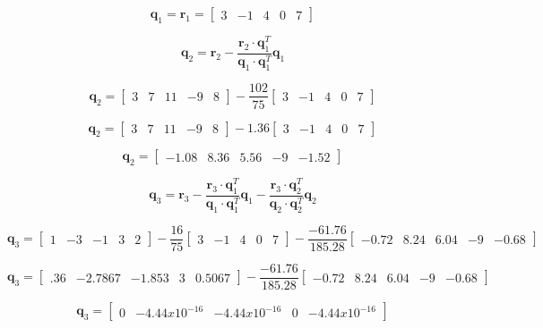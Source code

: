 \documentclass{article}
\begin{document}
\[
\mathbf{q}_1 = \mathbf{r}_1 = \begin{bmatrix} 3 & -1 & 4 & 0 & 7 \end{bmatrix}
\]

\[
\mathbf{q}_2 = \mathbf{r}_2 - \frac{\mathbf{r}_2 \cdot \mathbf{q}_1^T}{\mathbf{q}_1 \cdot \mathbf{q}_1^T} \mathbf{q}_1
\]

\[
\mathbf{q}_2 = \begin{bmatrix} 3 & 7 & 11 & -9 & 8 \end{bmatrix} - \frac{102}{75} \begin{bmatrix} 3 & -1 & 4 & 0 & 7 \end{bmatrix}
\]

\[
\mathbf{q}_2 = \begin{bmatrix} 3 & 7 & 11 & -9 & 8 \end{bmatrix} - 1.36 \begin{bmatrix} 3 & -1 & 4 & 0 & 7 \end{bmatrix}
\]

\[
\mathbf{q}_2 = \begin{bmatrix} -1.08 & 8.36 & 5.56 & -9 & -1.52 \end{bmatrix} 
\]

\[
\mathbf{q}_3 = \mathbf{r}_3 - \frac{\mathbf{r}_3 \cdot \mathbf{q}_1^T}{\mathbf{q}_1 \cdot \mathbf{q}_1^T} \mathbf{q}_1 - \frac{\mathbf{r}_3 \cdot \mathbf{q}_2^T}{\mathbf{q}_2 \cdot \mathbf{q}_2^T} \mathbf{q}_2
\]

\[
\mathbf{q}_3 = \begin{bmatrix} 1 & -3 & -1 & 3 & 2 \end{bmatrix} - \frac{16}{75} \begin{bmatrix} 3 & -1 & 4 & 0 & 7 \end{bmatrix} - \frac{-61.76}{185.28} \begin{bmatrix} -0.72 & 8.24 & 6.04 & -9 & -0.68 \end{bmatrix}
\]

\[
\mathbf{q}_3 = \begin{bmatrix} .36 & -2.7867 & -1.853 & 3 & 0.5067 \end{bmatrix} - \frac{-61.76}{185.28} \begin{bmatrix} -0.72 & 8.24 & 6.04 & -9 & -0.68 \end{bmatrix}
\]
    
\[
\mathbf{q}_3 = \begin{bmatrix} 0 & -4.44x10^{-16} & -4.44x10^{-16} & 0 & -4.44x10^{-16} \end{bmatrix}
\]
\end{document}
